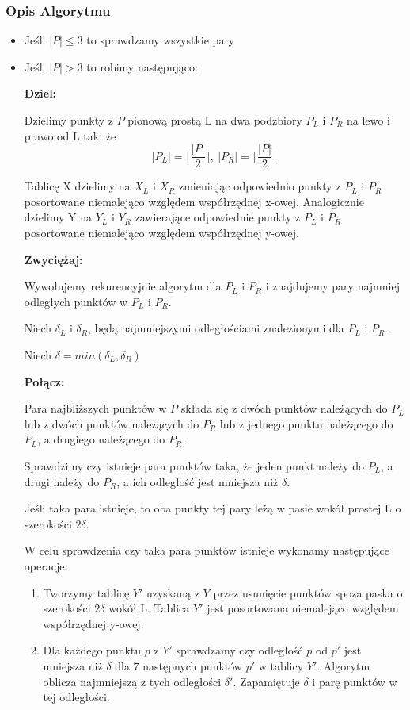 \subsubsection{Opis Algorytmu}
\begin{itemize}
\item Jeśli $\vert P \vert \leq 3$ to sprawdzamy wszystkie pary

\item Jeśli $\vert P \vert > 3$ to robimy następująco:

	
		\textbf{Dziel: } 		

		Dzielimy punkty z $P$ pionową prostą L na dwa podzbiory $P_L$ i $P_R$ na lewo i prawo od L tak, że $$\vert P_L \vert= \lceil \frac{\vert P \vert}{2}\rceil,\ \vert P_R \vert = \lfloor \frac{\vert P \vert}{2} \rfloor $$
	
		Tablicę X dzielimy na $X_L$ i $X_R$ zmieniając odpowiednio punkty z $P_L$ i $P_R$ posortowane niemalejąco względem współrzędnej x-owej. Analogicznie dzielimy Y na $Y_L$ i $Y_R$ zawierające odpowiednie punkty z $P_L$ i $P_R$ posortowane niemalejąco względem współrzędnej y-owej.

		\textbf{Zwyciężaj: }
		
Wywołujemy rekurencyjnie algorytm dla $P_L$ i $P_R$ i znajdujemy pary najmniej odległych punktów w $P_L$ i $P_R$. 

Niech $\delta_L$ i $\delta_R$, będą najmniejszymi odległościami znalezionymi dla $P_L$ i $P_R$. 

Niech $\delta=min(\delta_L,\delta_R)$
		
		\textbf{Połącz: } 

		Para najbliższych punktów w $P$ składa się z dwóch punktów należących do $P_L$ lub z dwóch punktów należących do $P_R$ lub z jednego punktu należącego do $P_L$, a drugiego należącego do $P_R$.
			
		Sprawdzimy czy istnieje para punktów taka, że jeden punkt należy do $P_L$, a drugi należy do $P_R$, a ich odległość jest mniejsza niż $\delta$.
		
		Jeśli taka para istnieje, to oba punkty tej pary leżą w pasie wokół prostej L o szerokości $2\delta$.
		
		W celu sprawdzenia czy taka para punktów istnieje wykonamy następujące operacje:
		\begin{enumerate}
			\item Tworzymy tablicę $Y'$ uzyskaną z $Y$ przez usunięcie punktów spoza paska o szerokości $2\delta$ wokół L. Tablica $Y'$ jest posortowana niemalejąco względem współrzędnej y-owej.
			\item Dla każdego punktu $p$ z $Y'$ sprawdzamy czy odległość $p$ od $p'$ jest mniejsza niż $\delta$ dla 7 następnych punktów $p'$ w tablicy $Y'$. Algorytm oblicza najmniejszą z tych odległości $\delta'$. Zapamiętuje $\delta$ i parę punktów w tej odległości.
		\end{enumerate}
		

\end{itemize}
